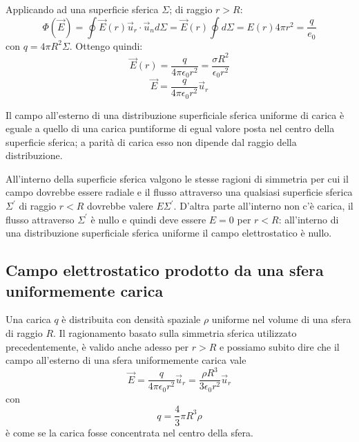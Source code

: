 \documentclass[class=book, crop=false, oneside, 12pt]{standalone}
\begin{document}
Applicando ad una superficie sferica \(\Sigma\); di raggio \(r > R\):
\begin{equation*}
    \Phi (\overrightarrow{E}) = \oint \overrightarrow{E}(r) \overrightarrow{u}_r \cdot \overrightarrow{u}_n d \Sigma = \overrightarrow{E}(r) \oint d \Sigma = E(r) 4 \pi r^2 = \frac{q}{e_0}
\end{equation*}
con \(q = 4 \pi R^2 \Sigma\). Ottengo quindi:
\begin{equation*}
    \overrightarrow{E}(r) = \frac{q}{4 \pi \epsilon_0 r^2} = \frac{\sigma R^2}{\epsilon_0 r^2}
\end{equation*}
\begin{equation*}
    \overrightarrow{E} = \frac{q}{4 \pi \epsilon_0 r^2} \overrightarrow{u}_r
\end{equation*}

Il campo all'esterno di una distribuzione superficiale sferica uniforme di carica è eguale a quello di una carica puntiforme di egual valore posta nel centro della superficie sferica; a parità di carica esso non dipende dal raggio della distribuzione.

All'interno della superficie sferica valgono le stesse ragioni di simmetria per cui il campo dovrebbe essere radiale e il flusso attraverso una qualsiasi superficie sferica \(\Sigma^{\prime}\) di raggio \(r < R\) dovrebbe valere \(E \Sigma^{\prime}\).
D'altra parte all'interno non c'è carica, il flusso attraverso \(\Sigma^{\prime}\) è nullo e quindi deve essere \(E = 0\) per \(r < R\): all'interno di una distribuzione superficiale sferica uniforme il campo elettrostatico è nullo.
\subsection{Campo elettrostatico prodotto da una sfera uniformemente carica}
Una carica \(q\) è distribuita con densità spaziale \(\rho\) uniforme nel volume di una sfera di raggio \(R\).  
Il ragionamento basato sulla simmetria sferica utilizzato precedentemente, è valido anche adesso per \(r > R\) e possiamo subito dire che il campo all'esterno di una sfera uniformemente carica vale
\begin{equation*}
    \overrightarrow{E} = \frac{q}{4 \pi \epsilon_0 r^2}\overrightarrow{u}_r = \frac{\rho R^3}{3 \epsilon_0 r^2} \overrightarrow{u}_r
\end{equation*}
con 
\begin{equation*}
    q = \frac{4}{3} \pi R^3 \rho
\end{equation*}
è come se la carica fosse concentrata nel centro della sfera.  
\end{document}
